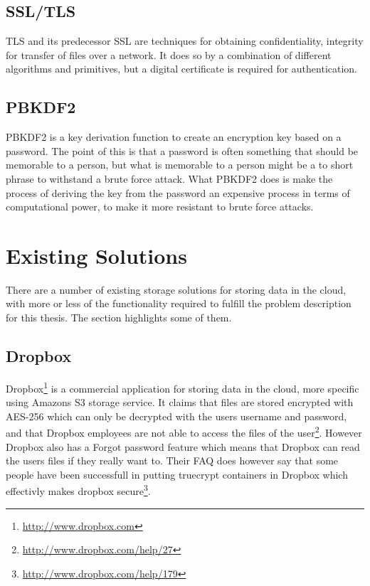 \documentclass[english,12pt,a4paper]{book}
\begin{document}
\subsection{SSL/TLS}
\ac{TLS} and its predecessor \ac{SSL} are techniques for obtaining
confidentiality, integrity for transfer of files over a
network\cite{stallings}. It does so by a combination of different algorithms
and primitives, but a digital certificate is required for authentication. 

\subsection{PBKDF2}
\ac{PBKDF2} is a key derivation function to create an encryption key based on
a password. The point of this is that a password is often something that should
be memorable to a person, but what is memorable to a person might be a to short
phrase to withstand a brute force attack. What \ac{PBKDF2} does is make the
process of deriving the key from the password an expensive process in terms of
computational power, to make it more resistant to brute force attacks.

\section{Existing Solutions}
There are a number of existing storage solutions for storing data in the cloud,
with more or less of the functionality required to fulfill the problem
description for this thesis. The section highlights some of them.

\subsection{Dropbox} Dropbox\footnote{\url{http://www.dropbox.com}} is a
commercial application for storing data in the cloud, more specific using
Amazons S3 storage service. It claims that files are stored encrypted with
\ac{AES}-256 which can only be decrypted with the users username and password,
and that Dropbox employees are not able to access the files of the
user\footnote{\url{http://www.dropbox.com/help/27}}. However Dropbox also has a
Forgot password feature which means that Dropbox can read the users files if
they really want to. Their \ac{FAQ} does however say that some people have been
successfull in putting truecrypt containers in Dropbox which effectivly makes
dropbox secure\footnote{\url{http://www.dropbox.com/help/179}}.
\end{document}
